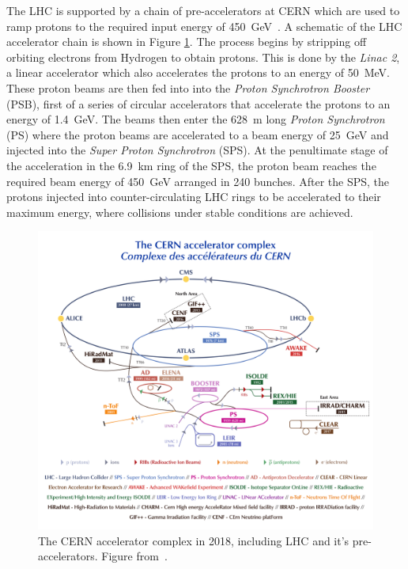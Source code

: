 The LHC is supported by a chain of pre-accelerators at CERN which are used to ramp protons to the required input energy of \SI{450}{\giga\eV}~\cite{LHCInjectorChain,LHCFacts}.
A schematic of the LHC accelerator chain is shown in Figure \cref{fig:method:CERN-complex}.
The process begins by stripping off orbiting electrons from Hydrogen to obtain protons. This is done by the \emph{Linac 2}, a linear accelerator which also accelerates the protons to an energy of \SI{50}{\mega\eV}.
These proton beams are then fed into into the \emph{Proton Synchrotron Booster} (PSB), first of a series of circular accelerators that accelerate the protons to an energy of \SI{1.4}{\giga\eV}.
The beams then enter the \SI{628}{\meter} long \emph{Proton Synchrotron} (PS) where the proton beams are accelerated to a beam energy of \SI{25}{\giga\eV} and injected into the \emph{Super Proton Synchrotron} (SPS).
At the penultimate stage of the acceleration in the \SI{6.9}{\kilo\meter} ring of the SPS, the proton beam reaches the required beam energy of \SI{450}{\giga\eV} arranged in 240 bunches.
After the SPS, the protons injected into counter-circulating LHC rings to be accelerated to their maximum energy, where collisions under stable conditions are achieved.
\begin{figure}
    \centering
    \includegraphics[width=\textwidth]{images/CCC-v2018-print-v2.pdf}
    \caption[The CERN accelerator complex]{The CERN accelerator complex in 2018, including LHC and it's pre-accelerators.
    Figure from~\cite{CERNComplex}.}
    \label{fig:method:CERN-complex}
\end{figure}

